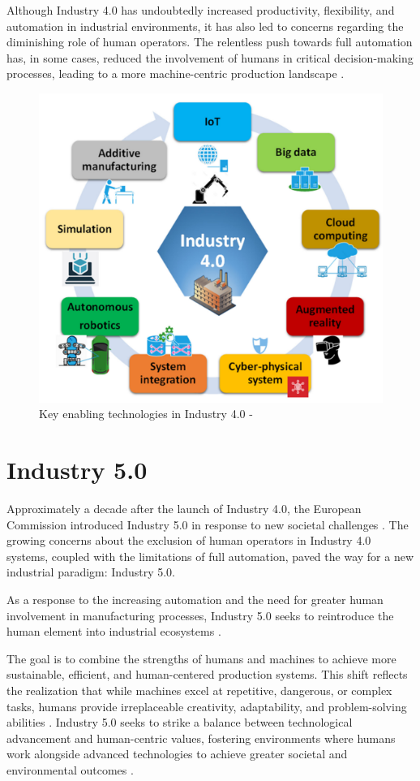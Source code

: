 Although Industry 4.0 has undoubtedly increased productivity, flexibility, and automation in industrial environments, it has also led to concerns 
regarding the diminishing role of human operators. The relentless push towards full automation has, in some cases, reduced the involvement of 
humans in critical decision-making processes, leading to a more machine-centric production landscape \cite{GOLOVIANKO2023102}.

\begin{figure}[!htbp]
    \centering
    \includegraphics[width=0.6\linewidth]{figs/key-tech-industry-4.png}
    \caption{Key enabling technologies in Industry 4.0 - \cite{Ahmed2022}}
    \label{fig:key-tech-industry-4}
\end{figure}
\FloatBarrier

\section{Industry 5.0}

Approximately a decade after the launch of Industry 4.0, the European Commission introduced Industry 5.0 in response to new societal challenges 
\cite{industry5}.
The growing concerns about the exclusion of human operators in Industry 4.0 systems, coupled with the limitations of full automation, paved the way 
for a new industrial paradigm: Industry 5.0. 

As a response to the increasing automation and the need for greater human involvement in manufacturing 
processes, Industry 5.0 seeks to reintroduce the human element into industrial ecosystems \cite{su11164371}.

The goal is to combine the strengths of humans and machines to achieve more sustainable, efficient, and human-centered production systems.
This shift reflects the realization that while machines excel at repetitive, dangerous, or complex tasks, humans provide irreplaceable creativity, 
adaptability, and problem-solving abilities \cite{10577684}.
Industry 5.0 seeks to strike a balance between technological advancement and human-centric values, fostering environments where humans work alongside 
advanced technologies to achieve greater societal and environmental outcomes \cite{GOLOVIANKO2023102}.

